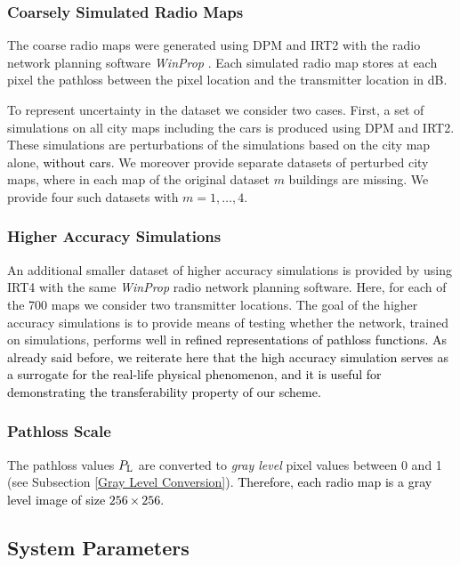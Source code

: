 \documentclass[10pt,a4paper]{article}
\begin{document}
\subsubsection{Coarsely Simulated Radio Maps}

The coarse radio maps were generated using DPM and IRT2 with the radio network planning software \emph{WinProp} \cite{WinPropFEKO}. 
Each simulated radio map stores at each pixel the pathloss between the pixel location and the transmitter location in dB.


To represent uncertainty in the dataset we consider two cases. 
First, a set of simulations on all city maps including the cars is produced using DPM and IRT2. 
These simulations are perturbations of the simulations based on the city map alone, \textcolor{black}{without cars}. 
We moreover provide separate datasets of perturbed city maps, where in each map of the original dataset $m$ buildings are missing. 
We provide four such datasets with $m=1,\ldots,4$. 

\subsubsection{Higher Accuracy Simulations}

An additional smaller dataset of higher accuracy simulations is provided by using IRT4 with the same \emph{WinProp} radio network planning software.  
Here, for each of the 700 maps we consider two transmitter locations. The goal of the higher accuracy simulations is to provide means of testing whether the network, trained on simulations, 
performs well in \textcolor{black}{refined representations of pathloss functions. As already said before, we reiterate here that the high accuracy simulation serves as a surrogate for the real-life physical phenomenon, and it is useful for demonstrating
the transferability property of our scheme. }

\subsubsection{Pathloss Scale}

The pathloss values $P_{\textup{L}}$ are converted to \emph{gray level} pixel values between 0 and 1
(see Subsection \ref{Gray Level Conversion}).  \textcolor{black}{Therefore, each radio map is a gray level image of size $256 \times 256$.}

\subsection{System Parameters} 
\label{sys-param}
\end{document}

